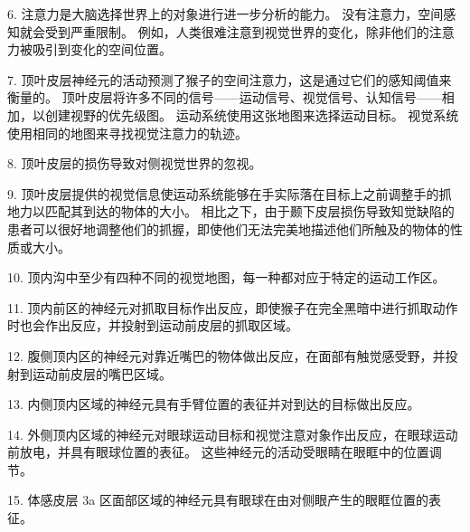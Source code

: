6. 注意力是大脑选择世界上的对象进行进一步分析的能力。
没有注意力，空间感知就会受到严重限制。
例如，人类很难注意到视觉世界的变化，除非他们的注意力被吸引到变化的空间位置。


7. 顶叶皮层神经元的活动预测了猴子的空间注意力，这是通过它们的感知阈值来衡量的。
顶叶皮层将许多不同的信号——运动信号、视觉信号、认知信号——相加，以创建视野的优先级图。
运动系统使用这张地图来选择运动目标。
视觉系统使用相同的地图来寻找视觉注意力的轨迹。


8. 顶叶皮层的损伤导致对侧视觉世界的忽视。


9. 顶叶皮层提供的视觉信息使运动系统能够在手实际落在目标上之前调整手的抓地力以匹配其到达的物体的大小。
相比之下，由于颞下皮层损伤导致知觉缺陷的患者可以很好地调整他们的抓握，即使他们无法完美地描述他们所触及的物体的性质或大小。


10. 顶内沟中至少有四种不同的视觉地图，每一种都对应于特定的运动工作区。


11. 顶内前区的神经元对抓取目标作出反应，即使猴子在完全黑暗中进行抓取动作时也会作出反应，并投射到运动前皮层的抓取区域。


12. 腹侧顶内区的神经元对靠近嘴巴的物体做出反应，在面部有触觉感受野，并投射到运动前皮层的嘴巴区域。 


13. 内侧顶内区域的神经元具有手臂位置的表征并对到达的目标做出反应。


14. 外侧顶内区域的神经元对眼球运动目标和视觉注意对象作出反应，在眼球运动前放电，并具有眼球位置的表征。
这些神经元的活动受眼睛在眼眶中的位置调节。


15. 体感皮层 3a 区面部区域的神经元具有眼球在由对侧眼产生的眼眶位置的表征。


